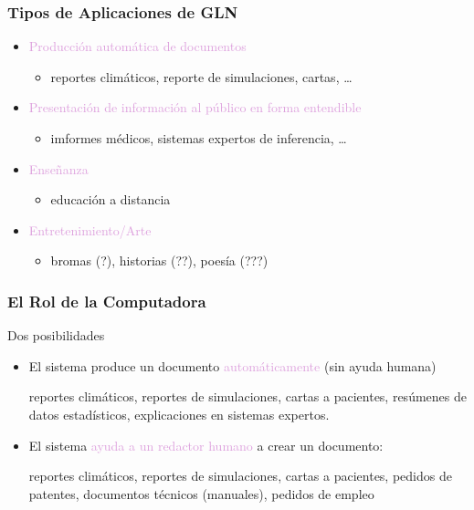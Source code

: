 \documentclass[compress,color=usenames]{beamer}
\newcommand{\mH}[1]{\textcolor{Plum}{#1}}
\begin{document}
\begin{frame}
\frametitle{Tipos de Aplicaciones de GLN}

\begin{itemize}
\item \mH{Producci\'on autom\'atica de documentos}
\begin{itemize}
\item reportes clim\'aticos, reporte de simulaciones, cartas, \ldots
\end{itemize}
\item \mH{Presentaci\'on de informaci\'on al p\'ublico en forma entendible}
\begin{itemize}
\item imformes m\'edicos, sistemas expertos de inferencia, \ldots
\end{itemize}
\item \mH{Ense\~nanza}
\begin{itemize}
\item educaci\'on a distancia
\end{itemize}
\item \mH{Entretenimiento/Arte}
\begin{itemize}
\item bromas (?), historias (??), poes\'ia (???)
\end{itemize}
\end{itemize}

\end{frame}

\begin{frame}
\frametitle{El Rol de la Computadora}

 Dos posibilidades
\begin{itemize}
\item  El sistema produce un documento \mH{autom\'aticamente} (sin ayuda humana) 

 reportes clim\'aticos, reportes de simulaciones, cartas a pacientes,
 res\'umenes de datos estad\'isticos, explicaciones en sistemas expertos.

\item El sistema \mH{ayuda a un redactor humano} a crear un documento:

 reportes clim\'aticos, reportes de simulaciones, cartas a pacientes,
 pedidos de patentes, documentos t\'ecnicos (manuales), pedidos de empleo
\end{itemize}

\end{frame}
\end{document}
